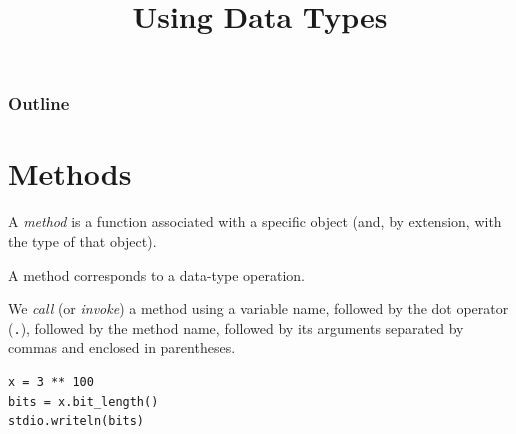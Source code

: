 \documentclass[8pt,a4paper,compress,handout]{beamer}
\title{Using Data Types}
\date{}
\begin{document}
\begin{frame}
\vfill
\titlepage
\end{frame}

\begin{frame}
\frametitle{Outline}
\tableofcontents
\end{frame}

\section{Methods}
\begin{frame}[fragile]
A \emph{method} is a function associated with a specific object (and, by extension, with the type of that object).

\bigskip

A method corresponds to a data-type operation.

\bigskip

We \emph{call} (or \emph{invoke}) a method using a variable name, followed by the dot operator (\lstinline{.}), followed by the method name, followed by its arguments separated by commas and enclosed in parentheses.

\begin{lstlisting}[language={}]
x = 3 ** 100
bits = x.bit_length()
stdio.writeln(bits)
\end{lstlisting}
\end{frame}
\end{document}
